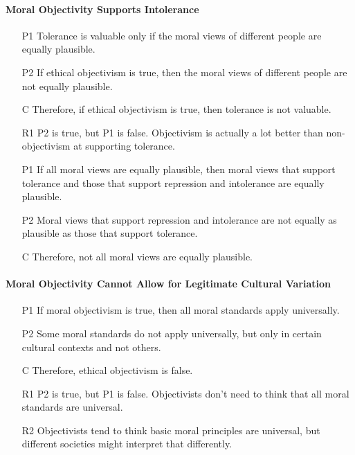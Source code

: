 \documentclass[12pt]{article}
\begin{document}
\paragraph{Moral Objectivity Supports Intolerance}
\begin{itemize}
    \item [P1] Tolerance is valuable only if the moral views of different people are equally plausible.
    \item [P2] If ethical objectivism is true, then the moral views of different people are not equally plausible.
    \item [C] Therefore, if ethical objectivism is true, then tolerance is not valuable.
    \item [R1] P2 is true, but P1 is false. Objectivism is actually a lot better than non-objectivism at supporting tolerance.
    \item [P1] If all moral views are equally plausible, then moral views that support tolerance and those that support repression and intolerance are equally plausible.
    \item [P2] Moral views that support repression and intolerance are not equally as plausible as those that support tolerance.
    \item [C] Therefore, not all moral views are equally plausible.
\end{itemize}

\paragraph{Moral Objectivity Cannot Allow for Legitimate Cultural Variation}
\begin{itemize}
    \item [P1] If moral objectivism is true, then all moral standards apply universally.
    \item [P2] Some moral standards do not apply universally, but only in certain cultural contexts and not others.
    \item [C] Therefore, ethical objectivism is false.
    \item [R1] P2 is true, but P1 is false. Objectivists don't need to think that all moral standards are universal.
    \item [R2] Objectivists tend to think basic moral principles are universal, but different societies might interpret that differently.
\end{itemize}
\end{document}
